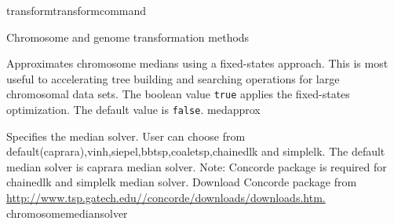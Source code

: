 \begin{command}{transform}{transformcommand}
\begin{arguments}
\begin{argumentgroup}{Chromosome and genome transformation methods}
\begin{description}
                    {Approximates chromosome medians using a fixed-states
                    approach. This is most useful to accelerating tree
                    building and searching operations for large chromosomal
                    data sets. The boolean value \texttt{true} applies the
                    fixed-states optimization. The default value is
                    \texttt{false}.}
                    {medapprox}
                        
                   {Specifies the median solver. User can choose from
                   default(caprara),vinh,siepel,bbtsp,coaletsp,chainedlk and simplelk. The
                   default median solver is caprara median solver. Note:
                   Concorde package is required for chainedlk and simplelk
                   median solver. Download Concorde package from \\
                  \url{http://www.tsp.gatech.edu//concorde/downloads/downloads.htm. } }
                   {chromosomemediansolver}
                       


\end{description}
\end{argumentgroup}
\end{arguments}
\end{command}
